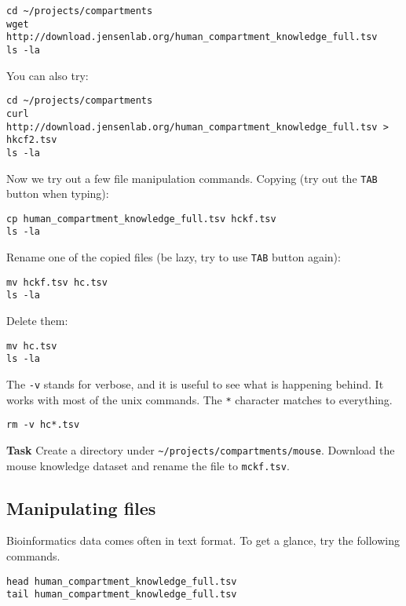 \documentclass{article}\usepackage[]{graphicx}\usepackage[usenames,dvipsnames]{color}
\begin{document}
\begin{verbatim}
cd ~/projects/compartments
wget http://download.jensenlab.org/human_compartment_knowledge_full.tsv
ls -la
\end{verbatim}

You can also try:
\begin{verbatim}
cd ~/projects/compartments
curl http://download.jensenlab.org/human_compartment_knowledge_full.tsv > hkcf2.tsv
ls -la
\end{verbatim}

Now we try out a few file manipulation commands. Copying (try out the \verb+TAB+ button when typing):

\begin{verbatim}
cp human_compartment_knowledge_full.tsv hckf.tsv
ls -la
\end{verbatim}

Rename one of the copied files (be lazy, try to use \verb+TAB+ button again):

\begin{verbatim}
mv hckf.tsv hc.tsv
ls -la
\end{verbatim}

Delete them:

\begin{verbatim}
mv hc.tsv
ls -la
\end{verbatim}

The \verb+-v+ stands for verbose, and it is useful to see what is happening behind. It works with most of the unix commands. The \verb+*+ character matches to everything.

\begin{verbatim}
rm -v hc*.tsv
\end{verbatim}

\textbf{Task} Create a directory under \verb+~/projects/compartments/mouse+. Download the mouse knowledge dataset and rename the file to \verb+mckf.tsv+.

\subsection{Manipulating files}

Bioinformatics data comes often in text format. To get a glance, try the following commands.

\begin{verbatim}
head human_compartment_knowledge_full.tsv
tail human_compartment_knowledge_full.tsv
\end{verbatim}
\end{document}
